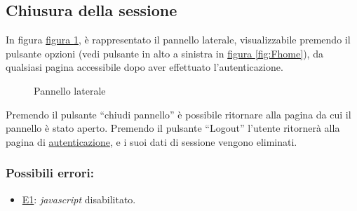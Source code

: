 \subsection{Chiusura della sessione}
\label{logout}
In figura \hyperref[fig:Flogout]{figura \ref{fig:Flogout}}, è rappresentato il pannello laterale, visualizzabile premendo il pulsante opzioni (vedi pulsante in alto a sinistra in \hyperref[fig:Fhome]{figura \ref{fig:Fhome}}), da qualsiasi pagina accessibile dopo aver effettuato l'autenticazione.

\begin{figure}[H] \centering 
{} \caption{Pannello laterale}
\label{fig:Flogout}
\end{figure}

Premendo il pulsante ``chiudi pannello'' è possibile ritornare alla pagina da cui il pannello è stato aperto.
Premendo il pulsante ``Logout'' l'utente ritornerà alla pagina di \hyperref[autenticazione]{autenticazione}, e i suoi dati di sessione vengono eliminati.

\subsubsection*{Possibili errori:}
\begin{itemize}
\item \hyperref[e1]{E1}: \textit{javascript} disabilitato.
\end{itemize}
